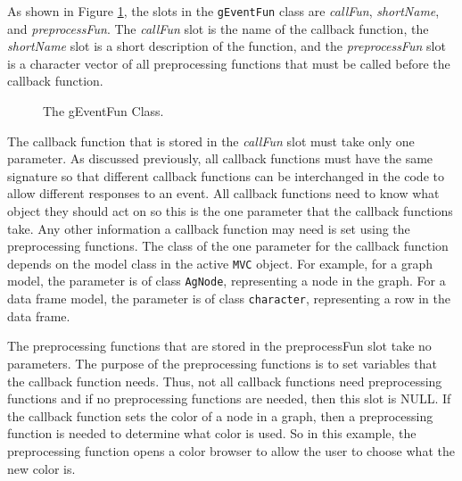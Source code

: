 \documentclass{article}[11pt]
\newcommand{\Robject}[1]{{\texttt{#1}}}
\newcommand{\Rslot}[1]{\textsl{#1}}
\newcommand{\Rclass}[1]{\texttt{#1}}
\begin{document}
As shown in Figure \ref{Fig:EventFun}, the slots in the \Rclass{gEventFun}
class are \Rslot{callFun}, \Rslot{shortName}, and \Rslot{preprocessFun}.  The
\Rslot{callFun} slot is the name of the callback function, the
\Rslot{shortName} slot is a short description of the function, and the
\Rslot{preprocessFun} slot is a character vector of all preprocessing
functions that must be called before the callback function.

\begin{figure}[ht]
  \begin{center}
    \caption{ The gEventFun Class. }
    \label{Fig:EventFun}
  \end{center}
\end{figure}

The callback function that is stored in the \Rslot{callFun} slot must take
only one parameter.  As discussed previously, all callback functions must have
the same signature so that different callback functions can be interchanged in
the code to allow different responses to an event.  All callback functions
need to know what object they should act on so this is the one
parameter that the callback functions take.  Any other information a callback
function may need is set using the preprocessing functions.  The class of
the one parameter for the callback function depends on the model class in
the active \Robject{MVC} object.  For example, for a graph model, the
parameter is of class \Rclass{AgNode}, representing a node in the graph.  For
a data frame model, the parameter is of class \Rclass{character}, representing
a row in the data frame. 

The preprocessing functions that are stored in the preprocessFun slot
take no parameters.  The purpose of the preprocessing functions is to set
variables that the callback function needs.  Thus, not all callback
functions need preprocessing functions and if no preprocessing functions
are needed, then this slot is NULL.  If the callback function sets the
color of a node in a graph, then a preprocessing function is needed to
determine what color is used.  So in this example, the preprocessing
function opens a color browser to allow the user to choose what the new
color is.
\end{document}
